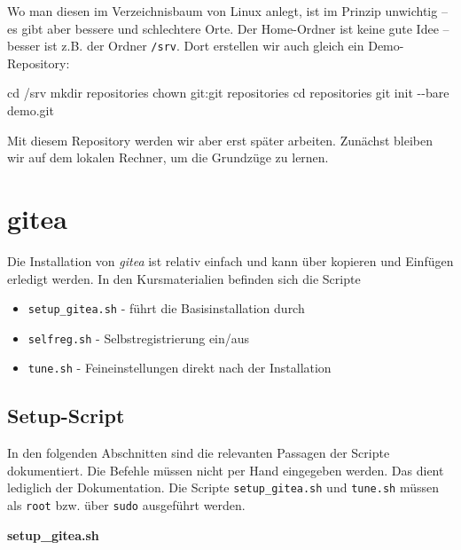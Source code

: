 \documentclass[
  letterpaper,
  DIV=11]{scrreprt}
\newenvironment{Shaded}{\begin{snugshade}}{\end{snugshade}}
\newcommand{\AttributeTok}[1]{\textcolor[rgb]{0.40,0.45,0.13}{#1}}
\newcommand{\BuiltInTok}[1]{\textcolor[rgb]{0.00,0.23,0.31}{#1}}
\newcommand{\FunctionTok}[1]{\textcolor[rgb]{0.28,0.35,0.67}{#1}}
\newcommand{\NormalTok}[1]{\textcolor[rgb]{0.00,0.23,0.31}{#1}}
\providecommand{\tightlist}{%
  \setlength{\itemsep}{0pt}\setlength{\parskip}{0pt}}\usepackage{longtable,booktabs,array}
\begin{document}
Wo man diesen im Verzeichnisbaum von Linux anlegt, ist im Prinzip
unwichtig -- es gibt aber bessere und schlechtere Orte. Der Home-Ordner
ist keine gute Idee -- besser ist z.B. der Ordner \texttt{/srv}. Dort
erstellen wir auch gleich ein Demo-Repository:

\begin{Shaded}
\begin{Highlighting}[]
\BuiltInTok{cd}\NormalTok{ /srv }
\FunctionTok{mkdir}\NormalTok{ repositories}
\FunctionTok{chown}\NormalTok{ git:git repositories }
\BuiltInTok{cd}\NormalTok{ repositories}
\FunctionTok{git}\NormalTok{ init }\AttributeTok{{-}{-}bare}\NormalTok{ demo.git}
\end{Highlighting}
\end{Shaded}

Mit diesem Repository werden wir aber erst später arbeiten. Zunächst
bleiben wir auf dem lokalen Rechner, um die Grundzüge zu lernen.


\chapter{gitea}\label{gitea}

Die Installation von \emph{gitea} ist relativ einfach und kann über
kopieren und Einfügen erledigt werden. In den Kursmaterialien befinden
sich die Scripte

\begin{itemize}
\tightlist
\item
  \texttt{setup\_gitea.sh} - führt die Basisinstallation durch
\item
  \texttt{selfreg.sh} - Selbstregistrierung ein/aus
\item
  \texttt{tune.sh} - Feineinstellungen direkt nach der Installation
\end{itemize}

\section{Setup-Script}\label{setup-script}

In den folgenden Abschnitten sind die relevanten Passagen der Scripte
dokumentiert. Die Befehle müssen nicht per Hand eingegeben werden. Das
dient lediglich der Dokumentation. Die Scripte \texttt{setup\_gitea.sh}
und \texttt{tune.sh} müssen als \texttt{root} bzw. über \texttt{sudo}
ausgeführt werden.

\textbf{setup\_gitea.sh}
\end{document}
